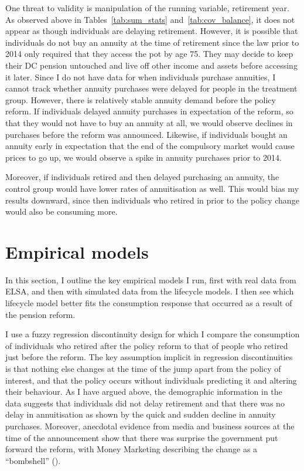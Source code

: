 \documentclass[12pt]{article}
\begin{document}
One threat to validity is manipulation of the running variable, retirement year.
As observed above in Tables~\ref{tab:sum_stats} and~\ref{tab:cov_balance}, it
does not appear as though individuals are delaying retirement. However, it is
possible that individuals do not buy an annuity at the time of retirement since
the law prior to 2014 only required that they access the pot by age 75. They may
decide to keep their DC pension untouched and live off other income and assets
before accessing it later. Since I do not have data for when individuals
purchase annuities, I cannot track whether annuity purchases were delayed for
people in the treatment group. However, there is relatively stable annuity
demand before the policy
reform. If individuals delayed annuity purchases in expectation of the reform,
so that they would not have to buy an annuity at all, we would observe declines
in purchases before the reform was announced. Likewise, if individuals bought an
annuity early in expectation that the end of the compulsory market would cause
prices to go up, we would observe a spike in annuity purchases prior to 2014.

Moreover, if individuals retired and then delayed purchasing an annuity, the
control group would have lower rates of annuitisation as well. This would bias
my results downward, since then individuals who retired in prior to the policy
change would also be consuming more.


\section{Empirical models}

In this section, I outline the key empirical models I run, first with real
data from ELSA, and then with simulated data from the lifecycle models. I then
see which lifecycle model better fits the consumption response that occurred as
a result of the pension reform.

I use a fuzzy regression discontinuity design for which I compare the
consumption of individuals who retired after the policy reform to that of people
who retired just before the reform. The key assumption implicit in regression
discontinuities is that nothing else changes at the time of the jump apart from
the policy of interest, and that the policy occurs without individuals
predicting it and altering their behaviour. As I have argued above, the
demographic information in the data suggests that individuals did not delay
retirement and that there was no delay in annuitisation as shown by the quick
and sudden decline in annuity purchases. Moreover, anecdotal evidence from media
and business sources at the time of the announcement show that there was
surprise the government put forward the reform, with Money Marketing describing
the change as a ``bombshell'' (\cite{money-marketing-announcement}).
\end{document}
